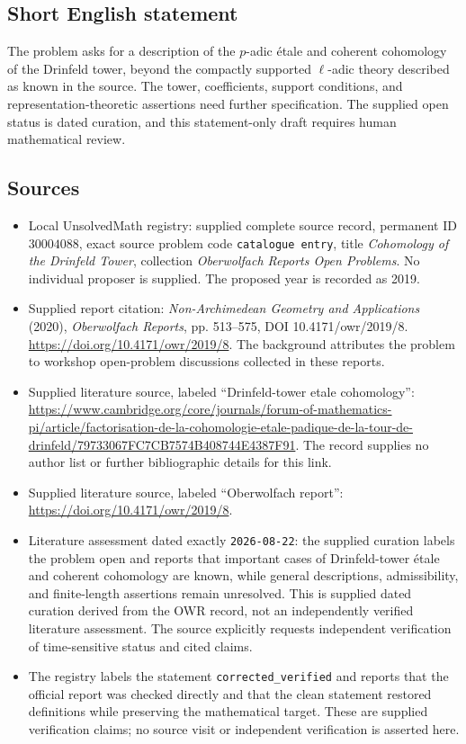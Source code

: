 \documentclass[11pt]{article}
\begin{document}
\subsection{Short English statement}
The problem asks for a description of the \(p\)-adic étale and coherent cohomology of the Drinfeld tower, beyond the compactly supported \(\ell\)-adic theory described as known in the source. The tower, coefficients, support conditions, and representation-theoretic assertions need further specification. The supplied open status is dated curation, and this statement-only draft requires human mathematical review.
\subsection{Sources}
\begin{itemize}
\item Local UnsolvedMath registry: supplied complete source record, permanent ID \(30004088\), exact source problem code \texttt{catalogue entry}, title \emph{Cohomology of the Drinfeld Tower}, collection \emph{Oberwolfach Reports Open Problems}. No individual proposer is supplied. The proposed year is recorded as 2019.
\item Supplied report citation: \emph{Non-Archimedean Geometry and Applications} (2020), \emph{Oberwolfach Reports}, pp. 513--575, DOI 10.4171/owr/2019/8. \url{https://doi.org/10.4171/owr/2019/8}. The background attributes the problem to workshop open-problem discussions collected in these reports.
\item Supplied literature source, labeled ``Drinfeld-tower etale cohomology'': \url{https://www.cambridge.org/core/journals/forum-of-mathematics-pi/article/factorisation-de-la-cohomologie-etale-padique-de-la-tour-de-drinfeld/79733067FC7CB7574B408744E4387F91}. The record supplies no author list or further bibliographic details for this link.
\item Supplied literature source, labeled ``Oberwolfach report'': \url{https://doi.org/10.4171/owr/2019/8}.
\item Literature assessment dated exactly \texttt{2026-08-22}: the supplied curation labels the problem open and reports that important cases of Drinfeld-tower étale and coherent cohomology are known, while general descriptions, admissibility, and finite-length assertions remain unresolved. This is supplied dated curation derived from the OWR record, not an independently verified literature assessment. The source explicitly requests independent verification of time-sensitive status and cited claims.
\item The registry labels the statement \texttt{corrected\_verified} and reports that the official report was checked directly and that the clean statement restored definitions while preserving the mathematical target. These are supplied verification claims; no source visit or independent verification is asserted here.
\end{itemize}
\end{document}
